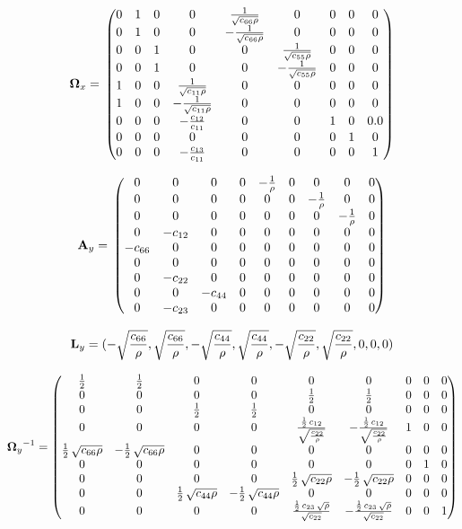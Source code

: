\[\mathbf{\Omega}_x = \\
\begin{pmatrix}0 & 1 & 0 & 0 & \frac{1}{\sqrt{c_{66} \rho}} & 0 & 0 & 0 & 0\cr 0 & 1 & 0 & 0 & -\frac{1}{\sqrt{c_{66} \rho}} & 0 & 0 & 0 & 0\cr 0 & 0 & 1 & 0 & 0 & \frac{1}{\sqrt{c_{55} \rho}} & 0 & 0 & 0\cr 0 & 0 & 1 & 0 & 0 & -\frac{1}{\sqrt{c_{55} \rho}} & 0 & 0 & 0\cr 1 & 0 & 0 & \frac{1}{\sqrt{c_{11} \rho}} & 0 & 0 & 0 & 0 & 0\cr 1 & 0 & 0 & -\frac{1}{\sqrt{c_{11} \rho}} & 0 & 0 & 0 & 0 & 0\cr 0 & 0 & 0 & -\frac{c_{12}}{c_{11}} & 0 & 0 & 1 & 0 & 0.0\cr 0 & 0 & 0 & 0 & 0 & 0 & 0 & 1 & 0\cr 0 & 0 & 0 & -\frac{c_{13}}{c_{11}} & 0 & 0 & 0 & 0 & 1\end{pmatrix}\]


\[\mathbf{A}_y = \\
\begin{pmatrix}0 & 0 & 0 & 0 & -\frac{1}{\rho} & 0 & 0 & 0 & 0\cr 0 & 0 & 0 & 0 & 0 & 0 & -\frac{1}{\rho} & 0 & 0\cr 0 & 0 & 0 & 0 & 0 & 0 & 0 & -\frac{1}{\rho} & 0\cr 0 & -c_{12} & 0 & 0 & 0 & 0 & 0 & 0 & 0\cr -c_{66} & 0 & 0 & 0 & 0 & 0 & 0 & 0 & 0\cr 0 & 0 & 0 & 0 & 0 & 0 & 0 & 0 & 0\cr 0 & -c_{22} & 0 & 0 & 0 & 0 & 0 & 0 & 0\cr 0 & 0 & -c_{44} & 0 & 0 & 0 & 0 & 0 & 0\cr 0 & -c_{23} & 0 & 0 & 0 & 0 & 0 & 0 & 0\end{pmatrix}\]


\[\mathbf{L}_y = \\
(-\sqrt{\frac{c_{66}}{\rho}},\sqrt{\frac{c_{66}}{\rho}},-\sqrt{\frac{c_{44}}{\rho}},\sqrt{\frac{c_{44}}{\rho}},-\sqrt{\frac{c_{22}}{\rho}},\sqrt{\frac{c_{22}}{\rho}}, 0, 0, 0)\]


\[{\mathbf{\Omega}_y}^{-1} = 
\begin{pmatrix}\frac{1}{2} & \frac{1}{2} & 0 & 0 & 0 & 0 & 0 & 0 & 0\cr 0 & 0 & 0 & 0 & \frac{1}{2} & \frac{1}{2} & 0 & 0 & 0\cr 0 & 0 & \frac{1}{2} & \frac{1}{2} & 0 & 0 & 0 & 0 & 0\cr 0 & 0 & 0 & 0 & \frac{\frac{1}{2}\,c_{12}}{\sqrt{\frac{c_{22}}{\rho}}} & -\frac{\frac{1}{2}\,c_{12}}{\sqrt{\frac{c_{22}}{\rho}}} & 1 & 0 & 0\cr \frac{1}{2}\,\sqrt{c_{66} \rho} & -\frac{1}{2}\,\sqrt{c_{66} \rho} & 0 & 0 & 0 & 0 & 0 & 0 & 0\cr 0 & 0 & 0 & 0 & 0 & 0 & 0 & 1 & 0\cr 0 & 0 & 0 & 0 & \frac{1}{2}\,\sqrt{c_{22} \rho} & -\frac{1}{2}\,\sqrt{c_{22} \rho} & 0 & 0 & 0\cr 0 & 0 & \frac{1}{2}\,\sqrt{c_{44} \rho} & -\frac{1}{2}\,\sqrt{c_{44} \rho} & 0 & 0 & 0 & 0 & 0\cr 0 & 0 & 0 & 0 & \frac{\frac{1}{2}\,c_{23}\,\sqrt{\rho}}{\sqrt{c_{22}}} & -\frac{\frac{1}{2}\,c_{23}\,\sqrt{\rho}}{\sqrt{c_{22}}} & 0 & 0 & 1\end{pmatrix}\]

